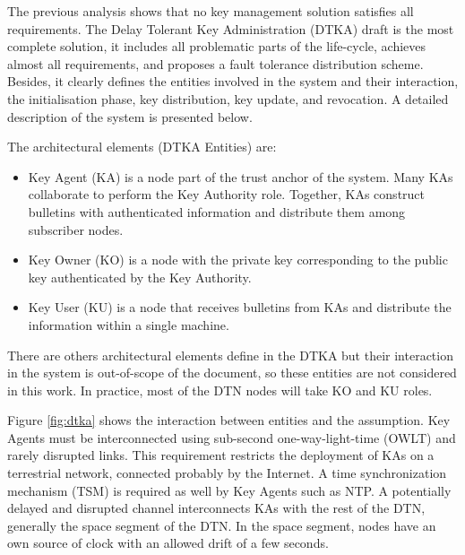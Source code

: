 The previous analysis shows that no key management solution satisfies all requirements. The Delay Tolerant Key Administration (DTKA) draft is the most complete solution, it includes all problematic parts of the life-cycle, achieves almost all requirements, and proposes a fault tolerance distribution scheme. Besides, it clearly defines the entities involved in the system and their interaction, the initialisation phase, key distribution, key update, and revocation. A detailed description of the system is presented below.  

The architectural elements (DTKA Entities) are:

\begin{itemize}
  \item  Key Agent (KA) is a node part of the trust anchor of the system. Many KAs collaborate to perform the Key Authority role. Together, KAs construct bulletins with authenticated information and distribute them among subscriber nodes.
  \item Key Owner (KO) is a node with the private key corresponding to the public key authenticated by the Key Authority.
  \item Key User (KU) is a node that receives bulletins from KAs and distribute the information within a single machine.
\end{itemize}

There are others architectural elements define in the DTKA but their interaction in the system is out-of-scope of the document, so these entities are not considered in this work. In practice, most of the DTN nodes will take KO and KU roles.


Figure \ref{fig:dtka} shows the interaction between entities and the assumption. Key Agents must be interconnected using sub-second one-way-light-time (OWLT) and rarely disrupted links. This requirement restricts the deployment of KAs on a terrestrial network, connected probably by the Internet. A time synchronization mechanism (TSM) is required as well by Key Agents such as NTP. A potentially delayed and disrupted channel interconnects KAs with the rest of the DTN, generally the space segment of the DTN. In the space segment, nodes have an own source of clock with an allowed drift of a few seconds.     


